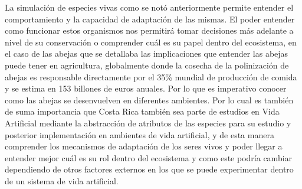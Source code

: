 \documentclass[conference]{IEEEtran}
\begin{document}
La simulaci\'on de especies vivas como se not\'o anteriormente permite entender el comportamiento y la capacidad de adaptaci\'on de las mismas. El poder entender como funcionar estos organismos nos permitir\'a tomar decisiones m\'as adelante a nivel de su conservaci\'on o comprender cu\'al es su papel dentro del ecosistema, en el caso de las abejas que se detallaba las implicaciones que entender las abejas puede tener en agricultura, globalmente donde la cosecha de la polinizaci\'on de abejas es responsable directamente por el 35\% mundial de producci\'on de comida y se estima en 153 billones de euros anuales. Por lo que es imperativo conocer como las abejas se desenvuelven en diferentes ambientes.\cite{ZOE01} 
Por lo cual es tambi\'en de suma importancia que Costa Rica tambi\'en sea parte de estudios en Vida Artificial mediante la abstracci\'on de atributos de las especies para su estudio y posterior implementaci\'on en ambientes de vida artificial, y de esta manera comprender los mecanismos de adaptaci\'on de los seres vivos y poder llegar a entender mejor cu\'al es su rol dentro del ecosistema y como este podr\'ia cambiar dependiendo de otros factores externos en los que se puede experimentar dentro de un sistema de vida artificial.

\nocite{*}


\end{document}
